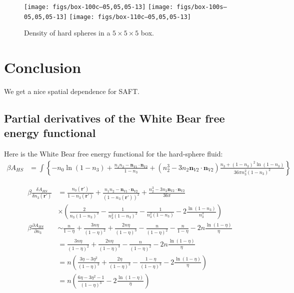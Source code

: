 \documentclass[letterpaper,twocolumn,amsmath,amssymb,prb]{revtex4-1}
\begin{document}
\begin{figure}
\texttt{[image: figs/box-100c--05,05,05-13]}
\texttt{[image: figs/box-100s--05,05,05-13]}
\texttt{[image: figs/box-110c--05,05,05-13]}
\caption{Density of hard spheres in a $5\times5\times5$ box.}
\label{fig:box-density}
\end{figure}


\section{Conclusion}
We get a nice spatial dependence for SAFT.

\begin{widetext}
  \appendix

  \section{Partial derivatives of the White Bear free energy functional}

  Here is the White Bear free energy functional for the hard-sphere
  fluid:~\cite{roth2002whitebear}
  \begin{align}
    \beta A_{HS} &= \int \left\{
    -n_0 \ln\left( 1 - n_3\right)
    + \frac{n_1 n_2 - \mathbf{n}_{V1} \cdot\mathbf{n}_{V2}}{1-n_3}
    + (n_2^3 - 3 n_2 \mathbf{n}_{V2} \cdot \mathbf{n}_{V2}) \frac{
      n_3 + (1-n_3)^2 \ln(1-n_3)
    }{
      36\pi n_3^2(1-n_3)^2
    }
    \right\}
\end{align}

\begin{align}
    \beta\frac{\delta A_{HS}}{\delta n_3(\mathbf{r}')} &=
    \frac{n_0(\mathbf{r}')}{1 - n_3(\mathbf{r}')}
    + \frac{n_1n_2 - \mathbf{n}_{V1}\cdot\mathbf{n}_{V2}}{(1 -
      n_3(\mathbf{r}'))^2}
    + \frac{n_2^3 -
      3n_2\mathbf{n}_{V2}\cdot\mathbf{n}_{V2}}{36\pi}
    \\
    & \times \left(\frac{2}{n_3(1-n_3)^3} -\frac1{n_3^2(1-n_3)^2}  -
      \frac{1}{n_3^2(1-n_3)} - 2\frac{\ln(1-n_3)}{n_3^3}\right) \\
    \beta\frac{\partial A_{HS}}{\partial n_3}
    &\sim \frac{n}{1-\eta} + \frac{3n\eta}{(1-\eta)^2} +
      \frac{2n\eta}{(1-\eta)^3} -
      \frac{n}{(1-\eta)^2} -
      \frac{n}{1-\eta} -
      2n \frac{ \ln(1-\eta) }{ \eta } \\
    &= \frac{3n\eta}{(1-\eta)^2} +
      \frac{2n\eta}{(1-\eta)^3} -
      \frac{n}{(1-\eta)^2} -
      2n \frac{ \ln(1-\eta) }{ \eta } \\
    &= n\left(
      \frac{3\eta - 3 \eta^2}{(1-\eta)^3} +
      \frac{2\eta}{(1-\eta)^3} -
      \frac{1 - \eta}{(1-\eta)^3} -
      2 \frac{ \ln(1-\eta) }{ \eta }
      \right) \\
    &= n\left(
      \frac{6\eta - 3 \eta^2 - 1}{(1-\eta)^3} -
      2 \frac{ \ln(1-\eta) }{ \eta }
      \right)
\end{align}
\end{widetext}
\end{document}
